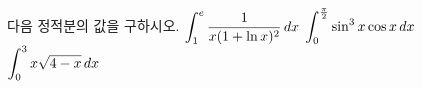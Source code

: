 다음 정적분의 값을 구하시오.
 $\displaystyle\int_{1}^{e}\dfrac{1}{x(1+\ln x)^2}\mkern3mu dx$
 $\displaystyle\int_{0}^{\frac{\pi}{2}}\sin^3 x\cos x\mkern3mu dx$
 $\displaystyle\int_{0}^{3}x\sqrt{4-x}\mkern3mu dx$
